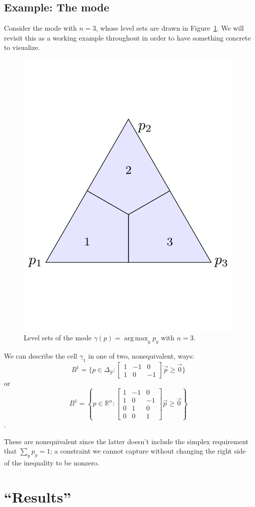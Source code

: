 \documentclass[12pt]{article}
\newcommand{\reals}{\mathbb{R}}
\newcommand{\simplex}{\Delta_\Y}
\newcommand{\Y}{\mathcal{Y}}
\DeclareMathOperator*{\argmax}{arg\,max}
\begin{document}
\subsection*{Example: The mode}
Consider the mode with $n=3$, whose level sets are drawn in Figure~\ref{fig:mode-simplex}.
We will revisit this as a working example throughout in order to have something concrete to visualize.

\begin{figure}
	\centering
	\includegraphics[width=0.5\linewidth]{figs/mode-simplex}
	\caption{Level sets of the mode $\gamma(p) = \argmax_y p_y$ with $n=3$.}
	\label{fig:mode-simplex}
\end{figure}

We can describe the cell $\gamma_1$ in one of two, nonequivalent, ways:
\[
B^1 = \{p \in \simplex: 
\begin{bmatrix}
1 & -1 & 0\\
1 & 0 & -1
\end{bmatrix} \vec p \geq \vec 0 \}
\]
or
\[
B^1 = \left\{p \in \reals^n: 
\begin{bmatrix}
1 & -1 & 0\\
1 & 0 & -1\\
0 & 1 & 0\\
0 & 0 & 1
\end{bmatrix} \vec p \geq \vec 0 \right\}
\].

These are nonequivalent since the latter doesn't include the simplex requirement that $\sum_y p_y = 1$; a constraint we cannot capture without changing the right side of the inequality to be nonzero.

\section*{``Results''}
\end{document}
